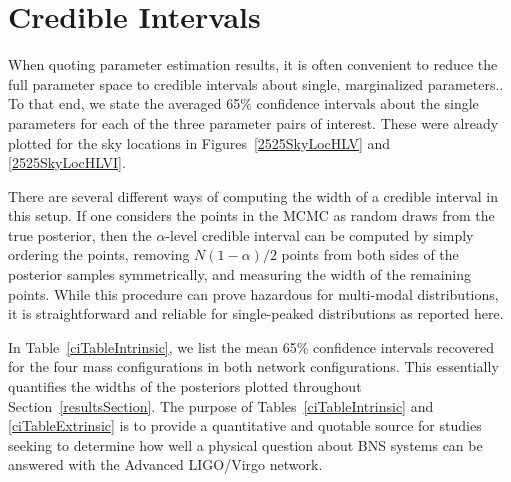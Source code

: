\documentclass[11pt,a4paper]{emulateapj} 
\newcommand{\carl}[1]{{\color{red} #1}}
\begin{document}

\section{Credible Intervals}
\label{ciSection}

When quoting parameter estimation results, it is often convenient to
reduce the full parameter space to credible intervals about single,
marginalized parameters..  To that end, we state the averaged 65\%
confidence intervals about the single parameters for each of the three
parameter pairs of interest.  These were already plotted for the sky
locations in Figures~\ref{2525SkyLocHLV} and \ref{2525SkyLocHLVI}.

There are several different ways of computing the width of a credible
interval in this setup.  If one considers the points in the MCMC as
random draws from the true posterior, then the $\alpha$-level credible
interval can be computed by simply ordering the points, removing
$N(1-\alpha )/2$ points from both sides of the posterior samples
symmetrically, and measuring the width of the remaining points.  While
this procedure can prove hazardous for multi-modal distributions, it
is straightforward and reliable for single-peaked distributions as
reported here.

In Table~\ref{ciTableIntrinsic}, we list the mean 65\% confidence
intervals recovered for the four mass configurations in both network
configurations. This essentially quantifies the widths of the
posteriors plotted throughout Section~\ref{resultsSection}.  The
purpose of Tables~\ref{ciTableIntrinsic} and \ref{ciTableExtrinsic} is
to provide a quantitative and quotable source for studies seeking to
determine how well a physical question about BNS systems can be
answered with the Advanced LIGO/Virgo network.
\end{document}
